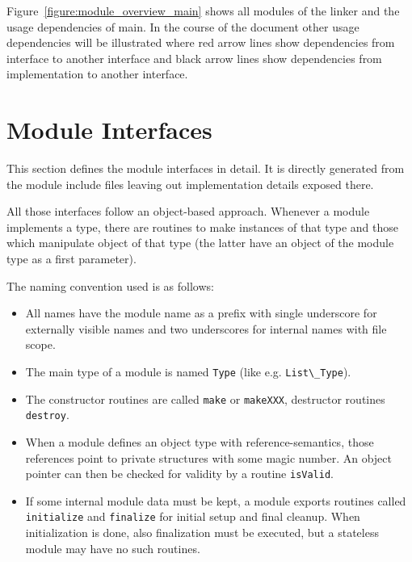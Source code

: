 \documentclass[10pt]{article}
\newcommand{\code}[1]{{\lstset{basicstyle=\normalsize\ttfamily}\lstinline!#1!}}
\begin{document}
Figure~\ref{figure:module_overview_main} shows all modules of the
linker and the usage dependencies of main.  In the course of the
document other usage dependencies will be illustrated where red arrow
lines show dependencies from interface to another interface and black
arrow lines show dependencies from implementation to another
interface.


\section{Module Interfaces}

This section defines the module interfaces in detail.  It is directly
generated from the module include files leaving out implementation
details exposed there.

All those interfaces follow an object-based approach.  Whenever a
module implements a type, there are routines to make instances of that
type and those which manipulate object of that type (the latter have
an object of the module type as a first parameter).

The naming convention used is as follows:
\begin{itemize}

  \item All names have the module name as a prefix with single
        underscore for externally visible names and two underscores
        for internal names with file scope.

  \item The main type of a module is named \code{Type} (like
        e.g. \code{List\_Type}).

  \item The constructor routines are called \code{make} or
        \code{makeXXX}, destructor routines \code{destroy}.

  \item When a module defines an object type with reference-semantics,
        those references point to private structures with some magic
        number.  An object pointer can then be checked for validity by
        a routine \code{isValid}.

  \item If some internal module data must be kept, a module exports
        routines called \code{initialize} and \code{finalize} for
        initial setup and final cleanup.  When initialization is done,
        also finalization must be executed, but a stateless module may
        have no such routines.

\end{itemize}
\end{document}
